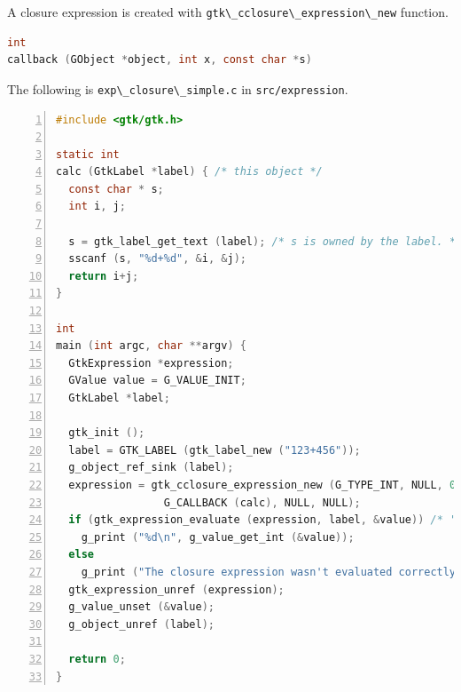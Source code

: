 A closure expression is created with
\passthrough{\lstinline!gtk\_cclosure\_expression\_new!} function.

\begin{lstlisting}[language=C]
int
callback (GObject *object, int x, const char *s)
\end{lstlisting}

The following is \passthrough{\lstinline!exp\_closure\_simple.c!} in
\passthrough{\lstinline!src/expression!}.

\begin{lstlisting}[language=C, numbers=left]
#include <gtk/gtk.h>

static int
calc (GtkLabel *label) { /* this object */
  const char * s;
  int i, j;

  s = gtk_label_get_text (label); /* s is owned by the label. */
  sscanf (s, "%d+%d", &i, &j);
  return i+j;
}

int
main (int argc, char **argv) {
  GtkExpression *expression;
  GValue value = G_VALUE_INIT;
  GtkLabel *label;

  gtk_init ();
  label = GTK_LABEL (gtk_label_new ("123+456"));
  g_object_ref_sink (label);
  expression = gtk_cclosure_expression_new (G_TYPE_INT, NULL, 0, NULL,
                 G_CALLBACK (calc), NULL, NULL);
  if (gtk_expression_evaluate (expression, label, &value)) /* 'this' object is the label. */
    g_print ("%d\n", g_value_get_int (&value));
  else
    g_print ("The closure expression wasn't evaluated correctly.\n");
  gtk_expression_unref (expression);
  g_value_unset (&value);
  g_object_unref (label);
  
  return 0;
}
\end{lstlisting}

